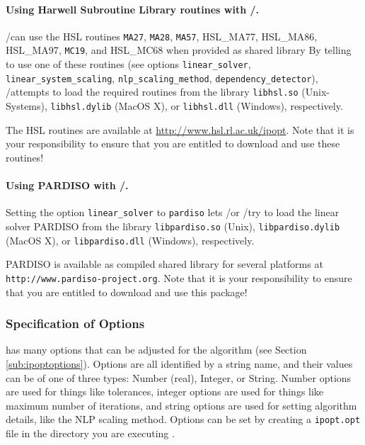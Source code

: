 \paragraph{Using Harwell Subroutine Library routines with \GAMS/\IPOPT.}

\GAMS/\IPOPT can use the HSL routines \texttt{MA27}, \texttt{MA28}, \texttt{MA57}, \textsc{HSL\_MA77}, \textsc{HSL\_MA86}, \textsc{HSL\_MA97}, \texttt{MC19}, and \textsc{HSL\_MC68} when provided as shared library
By telling \IPOPT to use one of these routines (see options \texttt{linear\_solver}, \texttt{linear\_system\_scaling}, \texttt{nlp\_scaling\_method}, \texttt{dependency\_detector}), \GAMS/\IPOPT attempts to load the required routines from the library \texttt{libhsl.so} (Unix-Systems), \texttt{libhsl.dylib} (MacOS X), or \texttt{libhsl.dll} (Windows), respectively.

The HSL routines are available at \url{http://www.hsl.rl.ac.uk/ipopt}.
Note that it is your responsibility to ensure that you are entitled to download and use these routines!

\paragraph{Using PARDISO with \GAMS/\IPOPT.}
Setting the option \texttt{linear\_solver} to \texttt{pardiso} lets \GAMS/\IPOPT or \GAMS/\IPOPTH try to load the linear solver PARDISO from the library \texttt{libpardiso.so} (Unix), \texttt{libpardiso.dylib} (MacOS X), or \texttt{libpardiso.dll} (Windows), respectively.

PARDISO is available as compiled shared library for several platforms at \texttt{http://www.pardiso-project.org}.
Note that it is your responsibility to ensure that you are entitled to download and use this package!

\subsubsection{Specification of Options}
\label{sub:ipoptoptionspec}

\IPOPT has many options that can be adjusted for the algorithm (see Section \ref{sub:ipoptoptions}).
Options are all identified by a string name, and their values can be of one of three types: Number (real), Integer, or String.
Number options are used for things like tolerances, integer options are used for things like maximum number of iterations, and string options are used for setting algorithm details, like the NLP scaling method.
Options can be set by creating a \texttt{ipopt.opt} file in the directory you are executing \IPOPT.

